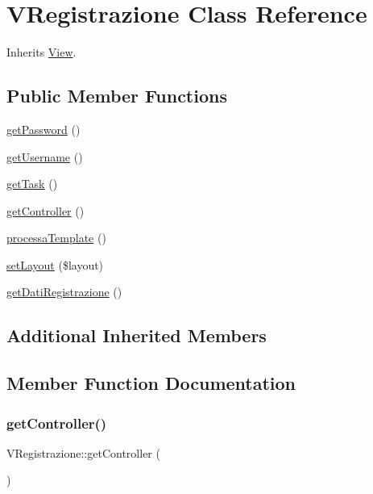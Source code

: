 \hypertarget{class_v_registrazione}{}\section{V\+Registrazione Class Reference}
\label{class_v_registrazione}


Inherits \mbox{\hyperlink{class_view}{View}}.

\subsection*{Public Member Functions}
\begin{DoxyCompactItemize}
\item 
\mbox{\hyperlink{class_v_registrazione_aa9099bafae4b691c8355251bbd58799a}{get\+Password}} ()
\item 
\mbox{\hyperlink{class_v_registrazione_a4aefbbdc87649de9c8ae8c8f9d70310a}{get\+Username}} ()
\item 
\mbox{\hyperlink{class_v_registrazione_ac02dfc8636611a3b90644cfabe25cbef}{get\+Task}} ()
\item 
\mbox{\hyperlink{class_v_registrazione_ae4e9e4f3a43cd784344da08aa2042fc3}{get\+Controller}} ()
\item 
\mbox{\hyperlink{class_v_registrazione_af24b75acb63fb916d4e3d7b586aa70f5}{processa\+Template}} ()
\item 
\mbox{\hyperlink{class_v_registrazione_afacb525933c2c700abd6758f18dd2516}{set\+Layout}} (\$layout)
\item 
\mbox{\hyperlink{class_v_registrazione_a792e7b07cf747d79a28345750a0a3950}{get\+Dati\+Registrazione}} ()
\end{DoxyCompactItemize}
\subsection*{Additional Inherited Members}


\subsection{Member Function Documentation}
\mbox{\label{class_v_registrazione_ae4e9e4f3a43cd784344da08aa2042fc3}} 
\subsubsection{\texorpdfstring{get\+Controller()}{getController()}}
{\footnotesize\ttfamily V\+Registrazione\+::get\+Controller (\begin{DoxyParamCaption}{ }\end{DoxyParamCaption})}

